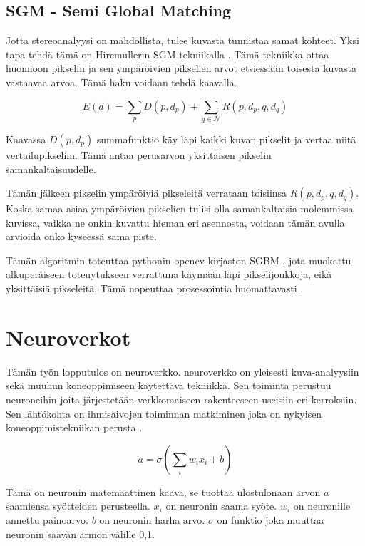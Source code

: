 \subsection{SGM - Semi Global Matching}

Jotta stereoanalyysi on mahdollista,
tulee kuvasta tunnistaa samat kohteet.
Yksi tapa tehdä tämä on Hircmullerin SGM tekniikalla \cite{hirschmuller2005babel}.
Tämä tekniikka ottaa huomioon pikselin ja sen ympäröivien pikselien arvot etsiessään toisesta kuvasta vastaavaa arvoa. Tämä haku voidaan tehdä kaavalla.

\begin{equation}\label{yht:SGM}
    E(d) = \sum_{p} D(p, d_p) + \sum_{q \in \mathcal{N}} R(p, d_p, q, d_q)
\end{equation}

Kaavassa \(D(p, d_p)\) summafunktio käy läpi kaikki kuvan pikselit ja vertaa niitä vertailupikseliin.
Tämä antaa perusarvon yksittäisen pikselin samankaltaisuudelle.

Tämän jälkeen pikselin ympäröiviä pikseleitä verrataan toisiinsa \(R(p, d_p, q, d_q)\).
Koska samaa asiaa ympäröivien pikselien tulisi olla samankaltaisia molemmissa kuvissa,
vaikka ne onkin kuvattu hieman eri asennosta, voidaan tämän avulla arvioida onko kyseessä sama piste.

Tämän algoritmin toteuttaa pythonin opencv kirjaston SGBM \cite{opencvsgbm},
jota muokattu alkuperäiseen toteuytukseen verrattuna käymään läpi pikselijoukkoja, eikä yksittäisiä pikseleitä.
Tämä nopeuttaa prosessointia huomattavasti \cite{MemoryEfficientSGM}.

\section{Neuroverkot} 

Tämän työn lopputulos on neuroverkko.
neuroverkko on yleisesti kuva-analyysiin sekä muuhun koneoppimiseen käytettävä tekniikka.
Sen toiminta perustuu neuroneihin joita järjestetään verkkomaiseen rakenteeseen useisiin eri kerroksiin.
Sen lähtökohta on ihmisaivojen toiminnan matkiminen joka on nykyisen koneoppimistekniikan perusta \cite{PhamTrungQuang2023EotH}.


\begin{equation}\label{yht:neuroni}
    a = \sigma\left(\sum_i w_i x_i + b\right)
\end{equation}

Tämä on neuronin matemaattinen kaava,
se tuottaa ulostulonaan arvon \(a\) saamiensa syötteiden perusteella.
\(x_i\) on neuronin saama syöte.
\(w_i\) on neuronille annettu painoarvo.
\(b\) on neuronin harha arvo. \(\sigma\) on funktio joka muuttaa neuronin saavan armon välille 0,1.


